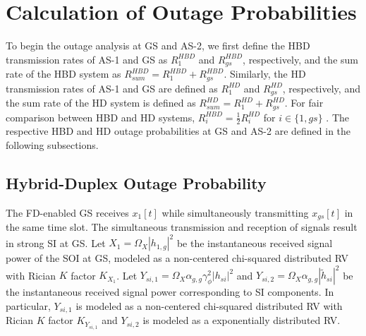 \section{Calculation of Outage Probabilities} 
To begin the outage analysis at GS and AS-2, we first define the HBD transmission rates of AS-1 and GS as $R^{HBD}_{1}$ and $R^{HBD}_{gs}$, respectively, and the sum rate of the HBD system as $R^{HBD}_{sum} = R^{HBD}_{1}+R^{HBD}_{gs}$. Similarly, the HD transmission rates of AS-1 and GS are defined as $R^{HD}_{1}$ and $R^{HD}_{gs}$, respectively, and the sum rate of the HD system is defined as $R^{HD}_{sum} = R^{HD}_{1}+R^{HD}_{gs}$. For fair comparison between HBD and HD systems, $R_{i}^{HBD}=\frac{1}{2}R_{i}^{HD}$ for $ i \in \{1, gs\}$ \cite{kwon2010optimal,baranwal2013outage,sofotasios2017full}. The respective HBD and HD outage probabilities at GS and AS-2 are defined in the following subsections.

\subsection{Hybrid-Duplex Outage Probability}
The FD-enabled GS receives $x_1[t]$ while simultaneously transmitting $x_{gs}[t]$ in the same time slot. The simultaneous transmission and reception of signals result in strong SI at GS. Let $X_{1}=\Omega_X|h_{1,g}|^2$ be the instantaneous received signal power of the SOI at GS, modeled as a non-centered chi-squared distributed RV with Rician $K$ factor $K_{X_{1}}$. Let $Y_{si,1}=\Omega_X\alpha_{g,g}\gamma_{\phi}^2|h_{si}|^2$ and $Y_{si,2}=\Omega_X\alpha_{g,g}|\widetilde{h}_{si}|^2$ be the instantaneous received signal power corresponding to SI components. In particular, $Y_{si,1}$ is modeled as a non-centered chi-squared distributed RV with Rician $K$ factor $K_{Y_{si,1}}$ and $Y_{si,2}$ is modeled as a exponentially distributed RV.

